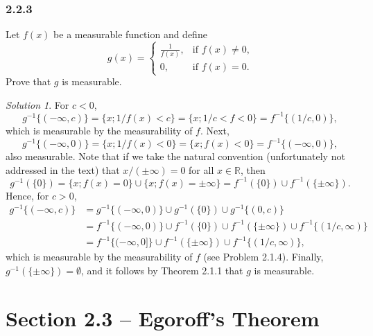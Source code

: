 \documentclass{report}
\newcommand{\bb}[1]{\mathbb{#1}}
\theoremstyle{remark}
\newtheorem*{solution}{Solution}
\begin{document}
\subsubsection*{2.2.3}
Let $f(x)$ be a measurable function and define
\begin{equation*}
  g(x) =
  \begin{cases}
    \frac{1}{f(x)}, & \text{if $f(x) \ne 0$,} \\
    0, & \text{if $f(x) = 0$.}
  \end{cases}
\end{equation*}
Prove that $g$ is measurable.

\begin{solution}
  For $c < 0$,
  \begin{equation*}
    g^{-1}\{(-\infty,c)\} = \{x; 1/f(x) < c\} = \{x; 1/c < f < 0\} = f^{-1}\{(1/c, 0)\},
  \end{equation*}
  which is measurable by the measurability of $f$. Next,
  \begin{equation*}
    g^{-1}\{(-\infty,0)\} = \{x; 1/f(x) < 0\} = \{x; f(x) < 0\} = f^{-1}\{(-\infty, 0)\},
  \end{equation*}
  also measurable. Note that if we take the natural convention (unfortunately not addressed in the text) that $x/(\pm \infty) = 0$ for all $x \in \bb R$, then
  \begin{equation*}
    g^{-1}(\{0\}) = \{x; f(x) = 0\} \cup \{x; f(x) = \pm \infty\} = f^{-1}(\{0\}) \cup f^{-1}(\{\pm \infty\}).
  \end{equation*}
  Hence, for $c > 0$,
  \begin{equation*}
    \begin{split}
      g^{-1}\{(-\infty,c)\} &= g^{-1}\{(-\infty,0)\} \cup g^{-1}(\{0\}) \cup g^{-1}\{(0,c)\} \\
      &= f^{-1}\{(-\infty, 0)\} \cup f^{-1}(\{0\}) \cup f^{-1}(\{\pm \infty\}) \cup f^{-1}\{(1/c, \infty)\} \\
      &= f^{-1}\{(-\infty, 0]\} \cup f^{-1}(\{\pm \infty\}) \cup f^{-1}\{(1/c, \infty)\},
    \end{split}
  \end{equation*}
  which is measurable by the measurability of $f$ (see Problem 2.1.4). Finally, $g^{-1}(\{\pm \infty\}) = \emptyset$, and it follows by Theorem 2.1.1 that $g$ is measurable.
\end{solution}

\section*{Section 2.3 -- Egoroff's Theorem}
\end{document}
